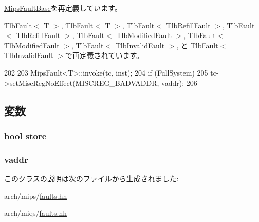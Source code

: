\hyperlink{classMipsISA_1_1MipsFaultBase_a2bd783b42262278d41157d428e1f8d6f}{MipsFaultBase}を再定義しています。

\hyperlink{classMipsISA_1_1TlbFault_a2bd783b42262278d41157d428e1f8d6f}{TlbFault$<$ T $>$}, \hyperlink{classMipsISA_1_1TlbFault_a2bd783b42262278d41157d428e1f8d6f}{TlbFault$<$ T $>$}, \hyperlink{classMipsISA_1_1TlbFault_a2bd783b42262278d41157d428e1f8d6f}{TlbFault$<$ TlbRefillFault $>$}, \hyperlink{classMipsISA_1_1TlbFault_a2bd783b42262278d41157d428e1f8d6f}{TlbFault$<$ TlbRefillFault $>$}, \hyperlink{classMipsISA_1_1TlbFault_a2bd783b42262278d41157d428e1f8d6f}{TlbFault$<$ TlbModifiedFault $>$}, \hyperlink{classMipsISA_1_1TlbFault_a2bd783b42262278d41157d428e1f8d6f}{TlbFault$<$ TlbModifiedFault $>$}, \hyperlink{classMipsISA_1_1TlbFault_a2bd783b42262278d41157d428e1f8d6f}{TlbFault$<$ TlbInvalidFault $>$}, と \hyperlink{classMipsISA_1_1TlbFault_a2bd783b42262278d41157d428e1f8d6f}{TlbFault$<$ TlbInvalidFault $>$}で再定義されています。


\begin{DoxyCode}
202     {
203         MipsFault<T>::invoke(tc, inst);
204         if (FullSystem)
205             tc->setMiscRegNoEffect(MISCREG_BADVADDR, vaddr);
206     }
\end{DoxyCode}


\subsection{変数}
\hypertarget{classMipsISA_1_1AddressFault_a86c0e52eeb2243d66bc032096c160a0b}{
\subsubsection[{store}]{\setlength{\rightskip}{0pt plus 5cm}bool {\bf store}}}
\label{classMipsISA_1_1AddressFault_a86c0e52eeb2243d66bc032096c160a0b}
\hypertarget{classMipsISA_1_1AddressFault_a9f933b300ef63eea367ca82f8da31025}{
\subsubsection[{vaddr}]{ {\bf vaddr}}}
\label{classMipsISA_1_1AddressFault_a9f933b300ef63eea367ca82f8da31025}


このクラスの説明は次のファイルから生成されました:\begin{DoxyCompactItemize}
\item 
arch/mips/\hyperlink{arch_2mips_2faults_8hh}{faults.hh}\item 
arch/miqs/\hyperlink{arch_2miqs_2faults_8hh}{faults.hh}\end{DoxyCompactItemize}
